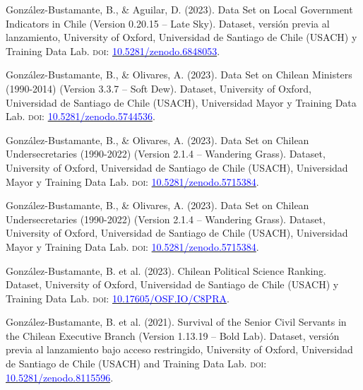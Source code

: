 \begin{publications}

\begin{benumerate}{6}

\item{\small González-Bustamante, B., \& Aguilar, D. (2023). Data Set on Local Government Indicators in Chile (Version 0.20.15 -- Late Sky). Dataset, versión previa al lanzamiento, University of Oxford, Universidad de Santiago de Chile (USACH) y Training Data Lab. {\scshape doi:} \href{https://doi.org/10.5281/zenodo.6848053}{\textcolor{blue}{10.5281/zenodo.6848053}}.}\vspace{1mm}

\item{\small González-Bustamante, B., \& Olivares, A. (2023). Data Set on Chilean Ministers (1990-2014) (Version 3.3.7 -- Soft Dew). Dataset, University of Oxford, Universidad de Santiago de Chile (USACH), Universidad Mayor y Training Data Lab. {\scshape doi:} \href{https://doi.org/10.5281/zenodo.5744536}{\textcolor{blue}{10.5281/zenodo.5744536}}.}\vspace{1mm}

\item{\small González-Bustamante, B., \& Olivares, A. (2023). Data Set on Chilean Undersecretaries (1990-2022) (Version 2.1.4 -- Wandering Grass). Dataset, University of Oxford, Universidad de Santiago de Chile (USACH), Universidad Mayor y Training Data Lab. {\scshape doi:} \href{https://doi.org/10.5281/zenodo.5715384}{\textcolor{blue}{10.5281/zenodo.5715384}}.}\vspace{1mm}

\item{\small González-Bustamante, B., \& Olivares, A. (2023). Data Set on Chilean Undersecretaries (1990-2022) (Version 2.1.4 -- Wandering Grass). Dataset, University of Oxford, Universidad de Santiago de Chile (USACH), Universidad Mayor y Training Data Lab. {\scshape doi:} \href{https://doi.org/10.5281/zenodo.5715384}{\textcolor{blue}{10.5281/zenodo.5715384}}.}\vspace{1mm}

\item{\small González-Bustamante, B. et al. (2023). Chilean Political Science Ranking. Dataset, University of Oxford, Universidad de Santiago de Chile (USACH) y Training Data Lab. {\scshape doi:} \href{http://doi.org/10.17605/OSF.IO/C8PRA}{\textcolor{blue}{10.17605/OSF.IO/C8PRA}}.}\vspace{1mm}

\item{\small González-Bustamante, B. et al. (2021). Survival of the Senior Civil Servants in the Chilean Executive Branch (Version 1.13.19 -- Bold Lab). Dataset, versión previa al lanzamiento bajo acceso restringido, University of Oxford, Universidad de Santiago de Chile (USACH) and Training Data Lab. {\scshape doi:} \href{https://doi.org/10.5281/zenodo.8115596}{\textcolor{blue}{10.5281/zenodo.8115596}}.}\vspace{1mm}

\end{benumerate}

\end{publications}

